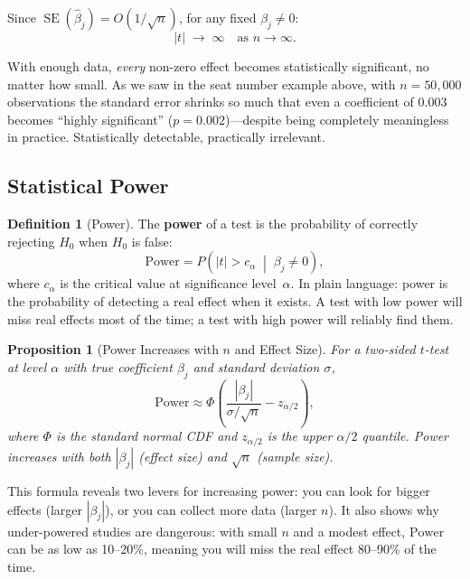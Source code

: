 \documentclass[11pt,a4paper]{article}
\theoremstyle{definition}
\newtheorem{definition}{Definition}[section]
\theoremstyle{plain}
\newtheorem{proposition}{Proposition}[section]
\theoremstyle{remark}
\newcommand{\se}{\operatorname{SE}}
\newcommand{\bhat}{\hat{\beta}}
\begin{document}
Since $\se(\bhat_j) = O(1/\sqrt{n})$, for any fixed $\beta_j \neq 0$:
\[
  |t| \;\to\; \infty \quad \text{as } n \to \infty.
\]

\begin{keyinsight}
With enough data, \emph{every} non-zero effect becomes statistically significant, no matter how small.
As we saw in the seat number example above, with $n = 50{,}000$ observations the standard error shrinks so much that even a coefficient of $0.003$ becomes ``highly significant'' ($p = 0.002$)---despite being completely meaningless in practice. Statistically detectable, practically irrelevant.
\end{keyinsight}

\subsection{Statistical Power}

\begin{definition}[Power]
The \textbf{power} of a test is the probability of correctly rejecting $H_0$ when $H_0$ is false:
\[
  \text{Power} = P\!\left(|t| > c_\alpha \;\middle|\; \beta_j \neq 0\right),
\]
where $c_\alpha$ is the critical value at significance level~$\alpha$.
In plain language: power is the probability of detecting a real effect when it exists. A test with low power will miss real effects most of the time; a test with high power will reliably find them.
\end{definition}

\begin{proposition}[Power Increases with $n$ and Effect Size]
For a two-sided $t$-test at level $\alpha$ with true coefficient $\beta_j$ and standard deviation $\sigma$,
\[
  \text{Power} \approx \Phi\!\left(\frac{|\beta_j|}{\sigma/\sqrt{n}} - z_{\alpha/2}\right),
\]
where $\Phi$ is the standard normal CDF and $z_{\alpha/2}$ is the upper $\alpha/2$ quantile.
Power increases with both $|\beta_j|$ (effect size) and $\sqrt{n}$ (sample size).
\end{proposition}

This formula reveals two levers for increasing power: you can look for bigger effects (larger $|\beta_j|$), or you can collect more data (larger $n$). It also shows why under-powered studies are dangerous: with small $n$ and a modest effect, $\text{Power}$ can be as low as 10--20\%, meaning you will miss the real effect 80--90\% of the time.
\end{document}

